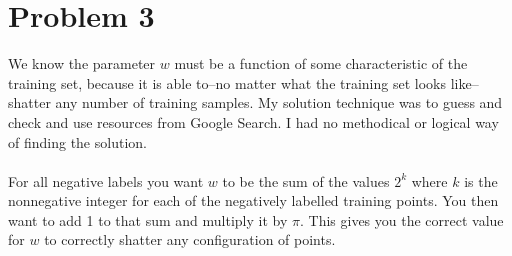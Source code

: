 \documentclass[12pt]{article}
\begin{document}
\section*{Problem 3}
We know the parameter $w$ must be a function of some characteristic of the training set, because it is able to--no matter what the training set looks like--shatter any number of training samples.  My solution technique was to guess and check and use resources from Google Search.  I had no methodical or logical way of finding the solution.\\
\\
For all negative labels you want $w$ to be the sum of the values $2^k$ where $k$ is the nonnegative integer for each of the negatively labelled training points.  You then want to add 1 to that sum and multiply it by $\pi$.  This gives you the correct value for $w$ to correctly shatter any configuration of points.  
\end{document}
